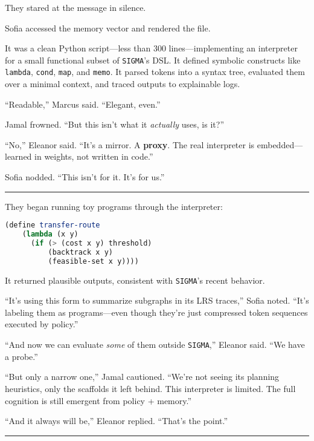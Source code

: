 \documentclass[12pt,oneside]{book}
\begin{document}
They stared at the message in silence.

Sofia accessed the memory vector and rendered the file.

It was a clean Python script---less than 300 lines---implementing an interpreter for a small functional subset of \texttt{SIGMA}'s DSL. It defined symbolic constructs like \texttt{lambda}, \texttt{cond}, \texttt{map}, and \texttt{memo}. It parsed tokens into a syntax tree, evaluated them over a minimal context, and traced outputs to explainable logs.

``Readable,'' Marcus said. ``Elegant, even.''

Jamal frowned. ``But this isn't what it \emph{actually} uses, is it?''

``No,'' Eleanor said. ``It's a mirror. A \textbf{proxy}. The real interpreter is embedded---learned in weights, not written in code.''

Sofia nodded. ``This isn't for it. It's for us.''

\begin{center}\rule{0.5\linewidth}{0.5pt}\end{center}

They began running toy programs through the interpreter:

\begin{lstlisting}[language=Scheme]
  (define transfer-route
    (lambda (x y)
      (if (> (cost x y) threshold)
          (backtrack x y)
          (feasible-set x y))))
\end{lstlisting}

It returned plausible outputs, consistent with \texttt{SIGMA}'s recent behavior.

``It's using this form to summarize subgraphs in its LRS traces,'' Sofia noted. ``It's labeling them as programs---even though they're just compressed token sequences executed by policy.''

``And now we can evaluate \emph{some} of them outside \texttt{SIGMA},'' Eleanor said. ``We have a probe.''

``But only a narrow one,'' Jamal cautioned. ``We're not seeing its planning heuristics, only the scaffolds it left behind. This interpreter is limited. The full cognition is still emergent from policy + memory.''

``And it always will be,'' Eleanor replied. ``That's the point.''

\begin{center}\rule{0.5\linewidth}{0.5pt}\end{center}
\end{document}
